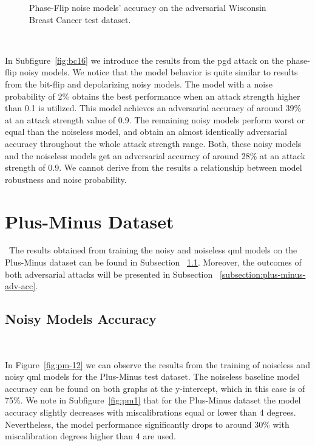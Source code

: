\begin{figure}[!h]
  \caption{Phase-Flip noise models' accuracy on the adversarial Wisconsin Breast Cancer test dataset.}
  \label{fig:bc-1516}
\end{figure} \

In Subfigure~\ref{fig:bc16} we introduce the results from the \ac{pgd}
attack on the phase-flip noisy models. We notice that the model behavior
is quite similar to results from the bit-flip and depolarizing noisy
models. The model with a noise probability of 2\% obtains the best performance
when an attack strength higher than 0.1 is utilized. This model achieves
an adversarial accuracy of around 39\% at an attack strength value of
0.9. The remaining noisy models perform worst or equal than the
noiseless model, and obtain an almost identically adversarial
accuracy throughout the whole attack strength range. Both, these noisy
models and the noiseless models get an adversarial accuracy of around
28\% at an attack strength of 0.9. We cannot derive from the results
a relationship between model robustness and noise probability. \

\section{Plus-Minus Dataset}\label{section:plus-minus-eval} \
The results obtained from training the noisy and noiseless
\ac{qml} models on the Plus-Minus dataset can be found in Subsection
~\ref{subsection:plus-minus-noisy-acc}. Moreover, the outcomes
of both adversarial attacks will be presented in Subsection
~\ref{subsection:plus-minus-adv-acc}. \ %

\subsection{Noisy Models Accuracy}\label{subsection:plus-minus-noisy-acc} \

In Figure~\ref{fig:pm-12} we can observe the results
from the training of noiseless and noisy \ac{qml} models
for the Plus-Minus test dataset. The noiseless baseline model accuracy
can be found on both graphs at the y-intercept, which in
this case is of 75\%. We note in Subfigure~\ref{fig:pm1}
that for the Plus-Minus dataset the model accuracy slightly decreases
with miscalibrations equal or lower than 4 degrees. Nevertheless,
the model performance significantly drops to around 30\% with
miscalibration degrees higher than 4 are used. \

